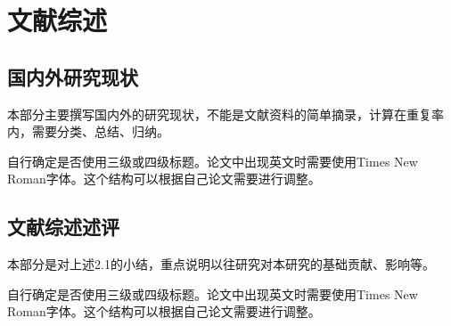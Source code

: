 \chapter{文献综述}

\section{国内外研究现状}

本部分主要撰写国内外的研究现状，不能是文献资料的简单摘录，计算在重复率内，需要分类、总结、归纳。

自行确定是否使用三级或四级标题。论文中出现英文时需要使用Times New Roman字体。这个结构可以根据自己论文需要进行调整。

\section{文献综述述评}

本部分是对上述2.1的小结，重点说明以往研究对本研究的基础贡献、影响等。

自行确定是否使用三级或四级标题。论文中出现英文时需要使用Times New Roman字体。这个结构可以根据自己论文需要进行调整。
